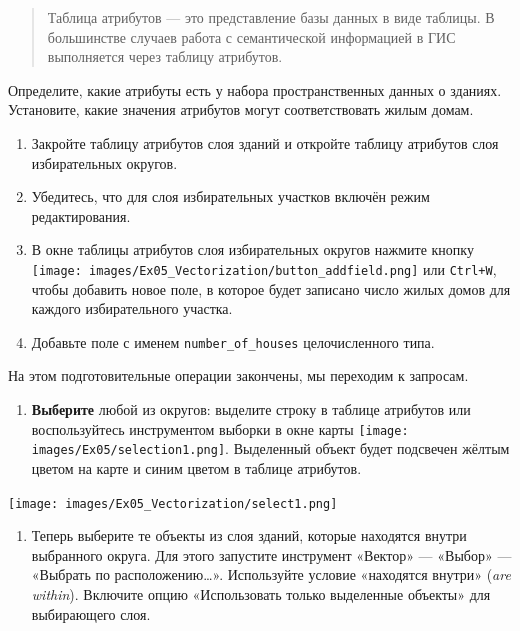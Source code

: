 \documentclass[
  12pt,
]{book}
\providecommand{\tightlist}{%
  \setlength{\itemsep}{0pt}\setlength{\parskip}{0pt}}
\begin{document}
\begin{quote}
Таблица атрибутов --- это представление базы данных в виде таблицы. В большинстве случаев работа с семантической информацией в ГИС выполняется через таблицу атрибутов.
\end{quote}

Определите, какие атрибуты есть у набора пространственных данных о зданиях. Установите, какие значения атрибутов могут соответствовать жилым домам.

\begin{enumerate}
\def\labelenumi{\arabic{enumi}.}
\setcounter{enumi}{1}
\item
  Закройте таблицу атрибутов слоя зданий и откройте таблицу атрибутов слоя избирательных округов.
\item
  Убедитесь, что для слоя избирательных участков включён режим редактирования.
\item
  В окне таблицы атрибутов слоя избирательных округов нажмите кнопку \texttt{[image: images/Ex05\_Vectorization/button\_addfield.png]} или \texttt{Ctrl+W}, чтобы добавить новое поле, в которое будет записано число жилых домов для каждого избирательного участка.
\item
  Добавьте поле с именем \texttt{number\_of\_houses} целочисленного типа.
\end{enumerate}

На этом подготовительные операции закончены, мы переходим к запросам.

\begin{enumerate}
\def\labelenumi{\arabic{enumi}.}
\setcounter{enumi}{2}
\tightlist
\item
  \textbf{Выберите} любой из округов: выделите строку в таблице атрибутов или воспользуйтесь инструментом выборки в окне карты \texttt{[image: images/Ex05/selection1.png]}. Выделенный объект будет подсвечен жёлтым цветом на карте и синим цветом в таблице атрибутов.
\end{enumerate}

\texttt{[image: images/Ex05\_Vectorization/select1.png]}

\begin{enumerate}
\def\labelenumi{\arabic{enumi}.}
\setcounter{enumi}{4}
\tightlist
\item
  Теперь выберите те объекты из слоя зданий, которые находятся внутри выбранного округа. Для этого запустите инструмент «Вектор» --- «Выбор» --- «Выбрать по расположению\ldots». Используйте условие «находятся внутри» (\emph{are within}). Включите опцию «Использовать только выделенные объекты» для выбирающего слоя.
\end{enumerate}
\end{document}

